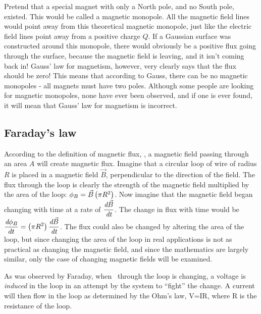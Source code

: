 \documentclass[12pt]{article}
\begin{document}
Pretend that a special magnet with only a North pole, and no South pole, existed. This would be called a magnetic monopole. All the magnetic field lines would point away from this theoretical magnetic monopole, just like the electric field lines point away from a positive charge $Q$. If a Gaussian surface was constructed around this monopole, there would obviously be a positive flux going through the surface, because the magnetic field is leaving, and it isn't coming back in! Gauss' law for magnetism, however, very clearly says that the flux should be zero! This means that according to Gauss, there can be no magnetic monopoles - all magnets must have two poles. Although some people are looking for magnetic monopoles, none have ever been observed, and if one is ever found, it will mean that Gauss' law for magnetism is incorrect.

\subsection{Faraday's law}

According to the definition of magnetic flux, \phib , a magnetic field passing through an area $A$ will create magnetic flux. Imagine that a circular loop of wire of radius $R$ is placed in a magnetic field $\vec{B}$, perpendicular to the direction of the field. The flux through the loop is clearly the strength of the magnetic field multiplied by the area of the loop: $\phi_B=\vec{B}\left(\pi R^2\right)$. Now imagine that the magnetic field began changing with time at a rate of $\displaystyle \frac{\emph{d}\vec{B}}{\emph{dt}}$. The change in flux with time would be $\displaystyle \frac{\emph{d}\phi_B}{dt}=\left(\pi R^2\right)\frac{\emph{d}\vec{B}}{\emph{dt}}$. The flux could also be changed by altering the area of the loop, but since changing the area of the loop in real applications is not as practical as changing the magnetic field, and since the mathematics are largely similar, only the case of changing magnetic fields will be examined.

As was observed by Faraday, when \phib \ through the loop is changing, a voltage is \textit{induced} in the loop in an attempt by the system to ``fight'' the change. A current will then flow in the loop as determined by the Ohm's law, V=IR, where R is the resistance of the loop.
\end{document}
